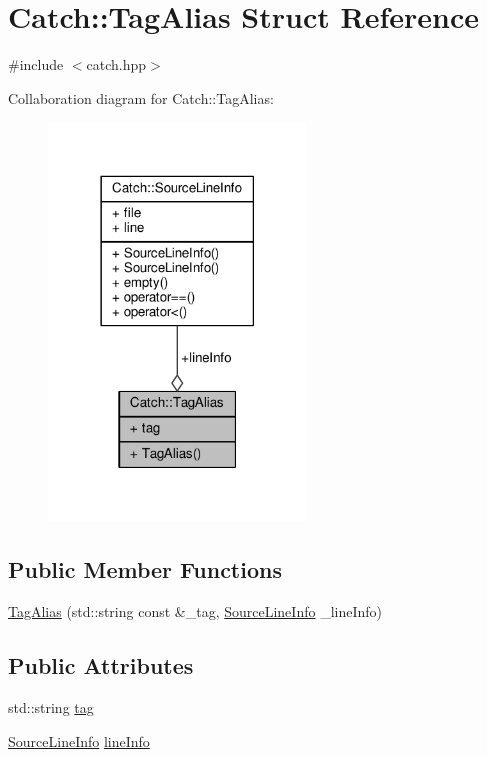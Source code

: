 \hypertarget{struct_catch_1_1_tag_alias}{\section{Catch\-:\-:Tag\-Alias Struct Reference}
\label{struct_catch_1_1_tag_alias}
}


{\ttfamily \#include $<$catch.\-hpp$>$}



Collaboration diagram for Catch\-:\-:Tag\-Alias\-:
\nopagebreak
\begin{figure}[H]
\begin{center}
\leavevmode
\includegraphics[width=194pt]{struct_catch_1_1_tag_alias__coll__graph}
\end{center}
\end{figure}
\subsection*{Public Member Functions}
\begin{DoxyCompactItemize}
\item 
\hyperlink{struct_catch_1_1_tag_alias_ae5a030edfbc8e37f28310d4ca599396c}{Tag\-Alias} (std\-::string const \&\-\_\-tag, \hyperlink{struct_catch_1_1_source_line_info}{Source\-Line\-Info} \-\_\-line\-Info)
\end{DoxyCompactItemize}
\subsection*{Public Attributes}
\begin{DoxyCompactItemize}
\item 
std\-::string \hyperlink{struct_catch_1_1_tag_alias_a950183883ab17c90d0fab16b966b6e2d}{tag}
\item 
\hyperlink{struct_catch_1_1_source_line_info}{Source\-Line\-Info} \hyperlink{struct_catch_1_1_tag_alias_a2f51fe0b3c052561275d26b6eb88f702}{line\-Info}
\end{DoxyCompactItemize}


